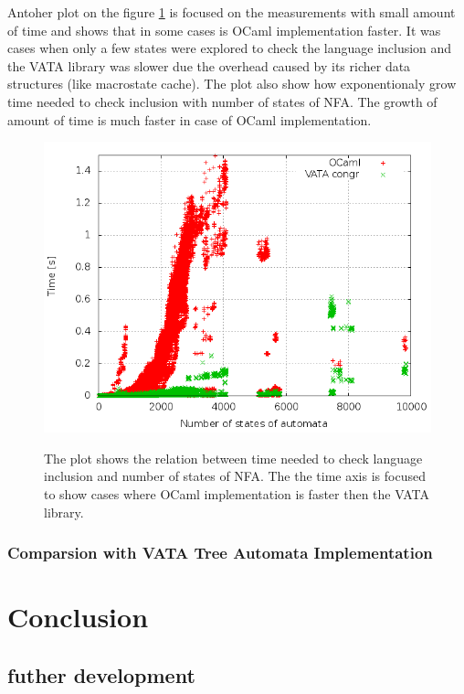 Antoher plot on the figure \ref{figGraphOCamlOpt} is focused on the measurements with small amount of time and 
shows that in some cases is OCaml implementation faster. It was cases when only a few states were explored to 
check the language inclusion and the VATA library was slower due the overhead caused by its richer data structures (like macrostate cache). The plot also show
how exponentionaly grow time needed to check inclusion with number of states of NFA. The growth of amount of time is much faster in case of OCaml implementation.

\begin{figure}
\begin{center}
\includegraphics[scale=0.5]{fig/plot_hkc_step_zprava.png}
\label{figGraphOCamlOpt}
\caption{The plot shows the relation between time needed to check language inclusion and number of states of NFA. The the time axis is focused to show
  cases where OCaml implementation is faster then the VATA library.}
\end{center}
\end{figure}

\subsection{Comparsion with VATA Tree Automata Implementation}

\chapter{Conclusion}
\label{concl}
\section{futher development}
